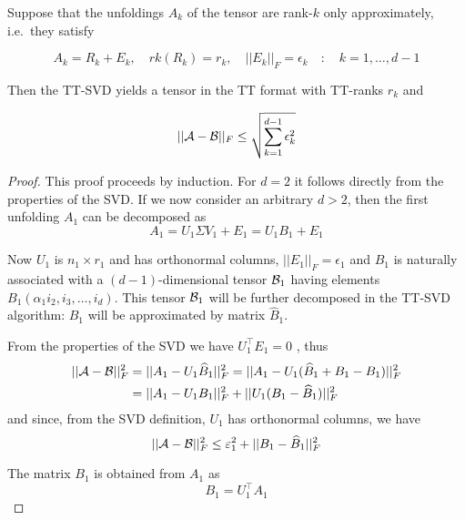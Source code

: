 \begin{Teo} \label{teo:ttsvd_approx}
  Suppose that the unfoldings $A_k$ of the tensor \A are rank-$k$ only approximately, i.e.\ they satisfy

  \begin{equation} \label{teo:ttsvd_approx:ip:1}
  A_k = R_k + E_k, \quad rk(R_k) = r_k, \quad ||E_k||_F = \epsilon_k \quad:\quad k = 1,\ldots,d-1
  \end{equation}

  Then the TT-SVD yields a tensor \B in the TT format with TT-ranks $r_k$ and

  \begin{equation}
    ||\mathcal{A} - \mathcal{B} ||_F \le \sqrt{\sum_{k=1}^{d-1} \epsilon_k^2}
  \end{equation}
  
  \begin{proof}
    This proof proceeds by induction. For $d=2$ it follows directly from the properties of the SVD. If we now consider an arbitrary $d > 2$, then the first unfolding $A_1$ can be decomposed as
    \[
    A_1 = U_1 \Sigma V_1 + E_1 = U_1 B_1 + E_1
    \]

    Now $U_1$ is $n_1 \times r_1$ and has orthonormal columns, $||E_1||_F = \epsilon_1$ and $B_1$ is naturally associated with a $(d-1)$-dimensional tensor $\mathcal{B}_1$ having elements $B_1(\alpha_1i_2,i_3,\ldots,i_d)$. This tensor $\mathcal{B}_1$ will be further decomposed in the TT-SVD algorithm: $B_1$ will be approximated by matrix $\hat{B}_1$.

    From the properties of the SVD we have $U_1^\top E_1 = 0$  , thus
    \begin{equation*}
      \begin{split}
        ||\mathcal{A}-\mathcal{B}||_F^2 &= ||A_1 - U_1\widehat{B}_1||_F^2 = ||A_1 - U_1(\widehat{B}_1 + B_1 - B_1)||_F^2 \\
         &= ||A_1 - U_1 B_1||_F^2 + ||U_1(B_1 - \widehat{B}_1)||_F^2
      \end{split}
    \end{equation*}
    and since, from the SVD definition, $U_1$ has orthonormal columns, we have
    \begin{equation} \label{teo:ttsvd_approx:proof:bound}
      ||\mathcal{A} - \mathcal{B}||_F^2 \le \varepsilon_1^2 + ||B_1 - \widehat{B}_1 ||_F^2
    \end{equation}

    The matrix $B_1$ is obtained from $A_1$ as
    \[
    B_1 = U_1^\top A_1
    \]


\end{proof}
\end{Teo}
